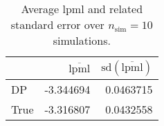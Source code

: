 \begin{table}[H]

\caption{Average lpml and related standard error over $n_{\text{sim}} = 10$ simulations.}
\centering
\begin{tabular}[t]{lrr}
\toprule
  & $\overbar{\text{lpml}}$ & $\text{sd}(\overbar{\text{lpml}})$\\
\midrule
DP & -3.344694 & 0.0463715\\
True & -3.316807 & 0.0432558\\
\bottomrule
\end{tabular}
\end{table}